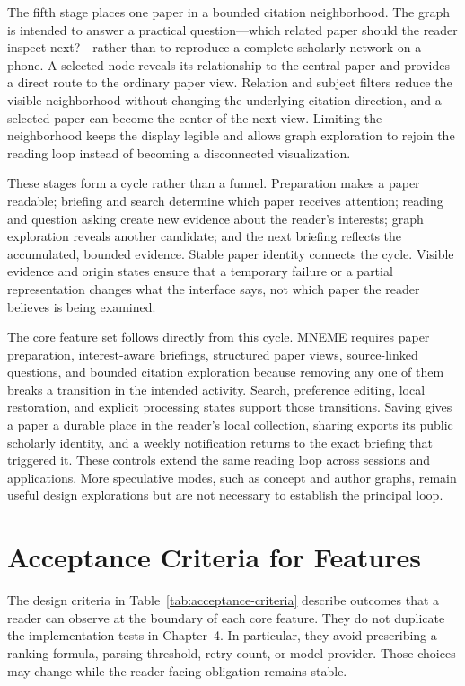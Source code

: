 The fifth stage places one paper in a bounded citation neighborhood. The graph is intended to answer a practical question---which related paper should the reader inspect next?---rather than to reproduce a complete scholarly network on a phone. A selected node reveals its relationship to the central paper and provides a direct route to the ordinary paper view. Relation and subject filters reduce the visible neighborhood without changing the underlying citation direction, and a selected paper can become the center of the next view. Limiting the neighborhood keeps the display legible and allows graph exploration to rejoin the reading loop instead of becoming a disconnected visualization.

These stages form a cycle rather than a funnel. Preparation makes a paper readable; briefing and search determine which paper receives attention; reading and question asking create new evidence about the reader's interests; graph exploration reveals another candidate; and the next briefing reflects the accumulated, bounded evidence. Stable paper identity connects the cycle. Visible evidence and origin states ensure that a temporary failure or a partial representation changes what the interface says, not which paper the reader believes is being examined.

The core feature set follows directly from this cycle. MNEME requires paper preparation, interest-aware briefings, structured paper views, source-linked questions, and bounded citation exploration because removing any one of them breaks a transition in the intended activity. Search, preference editing, local restoration, and explicit processing states support those transitions. Saving gives a paper a durable place in the reader's local collection, sharing exports its public scholarly identity, and a weekly notification returns to the exact briefing that triggered it. These controls extend the same reading loop across sessions and applications. More speculative modes, such as concept and author graphs, remain useful design explorations but are not necessary to establish the principal loop.

\section{Acceptance Criteria for Features}
\label{sec:acceptance-criteria}

The design criteria in Table~\ref{tab:acceptance-criteria} describe outcomes that a reader can observe at the boundary of each core feature. They do not duplicate the implementation tests in Chapter~4. In particular, they avoid prescribing a ranking formula, parsing threshold, retry count, or model provider. Those choices may change while the reader-facing obligation remains stable.

